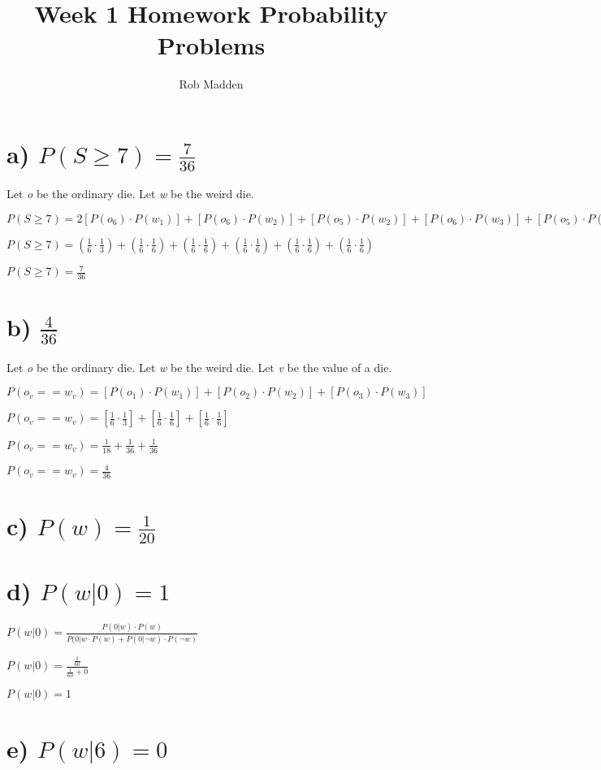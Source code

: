 \documentclass[11pt, oneside]{article}   	%
\title{Week 1 Homework Probability Problems}
\author{Rob Madden}
\begin{document}
\maketitle
\section*{a) $P(S \geq 7) = \frac{7}{36}$} 
Let \textit{o} be the ordinary die.
Let \textit{w} be the weird die.

$
P(S \geq7) = 2[P(o_6) \cdot P(w_1)] + [P(o_6) \cdot P(w_2)] + 
[P(o_5) \cdot P(w_2)] + [P(o_6) \cdot P(w_3)] + 
[P(o_5) \cdot P(w_3)] + [P(o_4) \cdot P(w_3)]
$

$
P(S \geq7) = (\frac{1}{6} \cdot \frac{1}{3}) + (\frac{1}{6} \cdot \frac{1}{6}) + (\frac{1}{6} \cdot \frac{1}{6}) + (\frac{1}{6} \cdot \frac{1}{6}) + (\frac{1}{6} \cdot \frac{1}{6}) + (\frac{1}{6} \cdot \frac{1}{6})
$

$
P(S \geq7) = \frac{7}{36}
$

\section*{b)  $\frac{4}{36}$}
Let \textit{o} be the ordinary die.
Let \textit{w} be the weird die.
Let \textit{v} be the value of a die.

$
P(o_v == w_v) = [P(o_1)  \cdot P(w_1)] + [P(o_2) \cdot P(w_2)] + [P(o_3) \cdot P(w_3)]
$

$
P(o_v == w_v) = [\frac{1}{6} \cdot \frac{1}{3}] + [\frac{1}{6} \cdot \frac{1}{6}] + [\frac{1}{6} \cdot \frac{1}{6}]
$

$
P(o_v == w_v) = \frac{1}{18} + \frac{1}{36} + \frac{1}{36}
$

$
P(o_v == w_v) = \frac{4}{36}
$

\section*{c) $P(w) = \frac{1}{20}$}

\section*{d) $P(w | 0) = 1$}

$
P(w | 0) = \frac{P(0 | w) \cdot P(w)}{P(0 | w \cdot P(w) + P(0 | \neg w) \cdot P(\neg w)}
$

$
P(w | 0) = \frac{\frac{1}{60}}{\frac{1}{60} + 0}
$

$
P(w | 0) = 1
$

\section*{e) $P(w | 6) = 0$}
\end{document}
